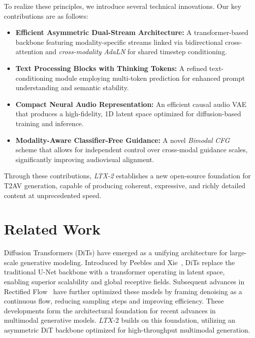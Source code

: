 \documentclass{article}
\begin{document}
To realize these principles, we introduce several technical innovations. Our key contributions are as follows:

\begin{itemize}

\item \textbf{Efficient Asymmetric Dual-Stream Architecture:}
A transformer-based backbone featuring modality-specific streams linked via bidirectional cross-attention and \textit{cross-modality AdaLN} for shared timestep conditioning.

\item \textbf{Text Processing Blocks with Thinking Tokens:}
A refined text-conditioning module employing multi-token prediction for enhanced prompt understanding and semantic stability.

\item \textbf{Compact Neural Audio Representation:} An efficient causal audio VAE that produces a high-fidelity, 1D latent space optimized for diffusion-based training and inference.

\item \textbf{Modality-Aware Classifier-Free Guidance:} A novel \textit{Bimodal CFG} scheme that allows for independent control over cross-modal guidance scales, significantly improving audiovisual alignment.

\end{itemize}
Through these contributions, \textit{LTX-2} establishes a new open-source foundation for T2AV generation, capable of producing coherent, expressive, and richly detailed content at unprecedented speed.

\section{Related Work}

Diffusion Transformers (DiTs) have emerged as a unifying architecture for large-scale generative modeling. Introduced by Peebles and Xie~\cite{peebles2023scalable}, DiTs replace the traditional U-Net backbone with a transformer operating in latent space, enabling superior scalability and global receptive fields. Subsequent advances in Rectified Flow~\cite{lipman2022flow} have further optimized these models by framing denoising as a continuous flow, reducing sampling steps and improving efficiency. These developments form the architectural foundation for recent advances in multimodal generative models. $\textit{LTX-2}$ builds on this foundation, utilizing an asymmetric DiT backbone optimized for high-throughput multimodal generation.
\end{document}

